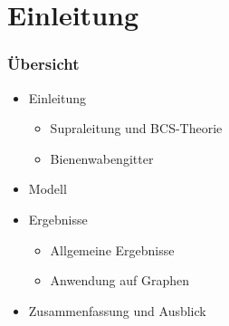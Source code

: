 \section{ Einleitung }

\begin{frame}
    \frametitle{Übersicht}
    \begin{itemize}
        \item Einleitung
        \begin{itemize}
            \item Supraleitung und BCS-Theorie
            \item Bienenwabengitter
        \end{itemize}
        \item Modell
        \item Ergebnisse
        \begin{itemize}
            \item Allgemeine Ergebnisse
            \item Anwendung auf Graphen 
        \end{itemize}
        \item Zusammenfassung und Ausblick
    \end{itemize}
\end{frame}

